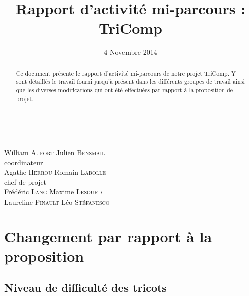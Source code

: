 \documentclass{article}
\title{Rapport d'activité mi-parcours : TriComp}
\author{}
\date{4 Novembre 2014}
\begin{document}
\makeatletter %
  \begin{titlepage}
    \begin{center}
       {\LARGE \@title} \\
       \vspace{2cm}
       {\large \@date}
       \vspace{3cm}
    \end{center}
       {\large
       {William \textsc{Aufort} \hfill Julien \textsc{Bensmail} \\}
    \vspace{1cm}
       {\hfill coordinateur \\}
       {Agathe \textsc{Herrou}  \hfill Romain \textsc{Labolle} \\}
       \vspace{1cm}
       {chef de projet \\}
       \vspace{1.5cm}
       {Frédéric \textsc{Lang} \hfill Maxime \textsc{Lesourd} \\}
       {Laureline \textsc{Pinault} \hfill Léo \textsc{Stéfanesco} \\}}
       \vspace{2.5cm}
    \begin{abstract}
	Ce document présente le rapport d'activité mi-parcours de notre projet TriComp. Y sont détaillés le travail fourni jusqu'à présent
dans les différents groupes de travail ainsi que les diverses modifications qui ont été effectuées par rapport à la proposition de projet.
    \end{abstract}
  \end{titlepage}
\makeatother


\newpage

\tableofcontents

\newpage


\section{Changement par rapport à la proposition}

\subsection{Niveau de difficulté des tricots}
\end{document}
